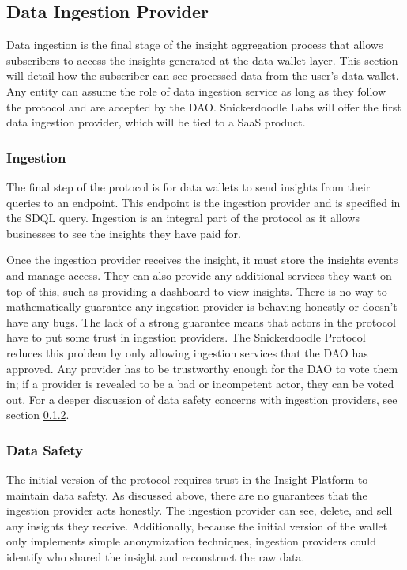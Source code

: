 \subsection{Data Ingestion Provider} %
Data ingestion is the final stage of the insight aggregation process that allows subscribers to access the insights generated at the data wallet layer. This section will detail how the subscriber can see processed data from the user's data wallet. Any entity can assume the role of data ingestion service as long as they follow the protocol and are accepted by the DAO. Snickerdoodle Labs will offer the first data ingestion provider, which will be tied to a SaaS product. 

\subsubsection{Ingestion}
The final step of the protocol is for data wallets to send insights from their queries to an endpoint. This endpoint is the ingestion provider and is specified in the SDQL query. Ingestion is an integral part of the protocol as it allows businesses to see the insights they have paid for.



Once the ingestion provider receives the insight, it must store the insights events and manage access. They can also provide any additional services they want on top of this, such as providing a dashboard to view insights. There is no way to mathematically guarantee any ingestion provider is behaving honestly or doesn't have any bugs. The lack of a strong guarantee means that actors in the protocol have to put some trust in ingestion providers. The Snickerdoodle Protocol reduces this problem by only allowing ingestion services that the DAO has approved. Any provider has to be trustworthy enough for the DAO to vote them in; if a provider is revealed to be a bad or incompetent actor, they can be voted out. For a deeper discussion of data safety concerns with ingestion providers, see section \ref{section:IngestionDataSafety}.

\subsubsection{Data Safety}
\label{section:IngestionDataSafety}
The initial version of the protocol requires trust in the Insight Platform to maintain data safety. As discussed above, there are no guarantees that the ingestion provider acts honestly. The ingestion provider can see, delete, and sell any insights they receive. Additionally, because the initial version of the wallet only implements simple anonymization techniques, ingestion providers could identify who shared the insight and reconstruct the raw data. 


